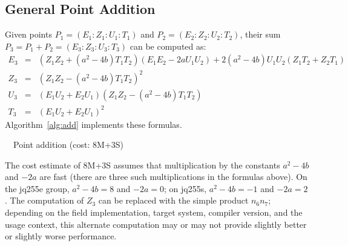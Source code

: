 \documentclass{llncs}
\begin{document}
\subsection{General Point Addition}

Given points $P_1 = (E_1{:}Z_1{:}U_1{:}T_1)$
and $P_2 = (E_2{:}Z_2{:}U_2{:}T_2)$, their sum
$P_3 = P_1 + P_2 = (E_3{:}Z_3{:}U_3{:}T_3)$ can be computed as:
\begin{eqnarray*}
    E_3 &=& (Z_1 Z_2 + (a^2-4b) T_1 T_2)(E_1 E_2 - 2a U_1 U_2)
          + 2(a^2-4b) U_1 U_2 (Z_1 T_2 + Z_2 T_1) \\
    Z_3 &=& (Z_1 Z_2 - (a^2-4b) T_1 T_2)^2 \\
    U_3 &=& (E_1 U_2 + E_2 U_1)(Z_1 Z_2 - (a^2 - 4b) T_1 T_2) \\
    T_3 &=& (E_1 U_2 + E_2 U_1)^2
\end{eqnarray*}
Algorithm~\ref{alg:add} implements these formulas.

\begin{algorithm}[H]
    \caption{\ \ Point addition (cost: 8M+3S)}\label{alg:add}
    \begin{algorithmic}[1]
    \end{algorithmic}
\end{algorithm}

The cost estimate of 8M+3S assumes that multiplication by the constants
$a^2-4b$ and $-2a$ are fast (there are three such multiplications in the
formulas above). On the jq255e group, $a^2-4b = 8$ and $-2a = 0$; on
jq255s, $a^2-4b = -1$ and $-2a = 2$. The computation of $Z_3$ can be
replaced with the simple product $n_6 n_7$; depending on the field
implementation, target system, compiler version, and the usage context,
this alternate computation may or may not provide slightly better or
slightly worse performance.
\end{document}
